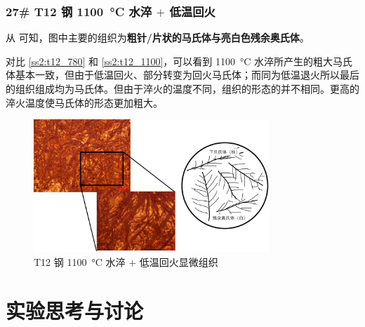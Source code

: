 \documentclass[a4paper,utf8]{article}
\begin{document}
        \subsubsection{27\# T12 钢 \SI{1100}{\degreeCelsius} 水淬 $+$ 低温回火\label{ss2:t12_1100}}
            从 可知，图中主要的组织为\textbf{粗针/片状的马氏体与亮白色残余奥氏体}。\par
            对比 \ref{ss2:t12_780} 和 \ref{ss2:t12_1100}，可以看到 \SI{1100}{\degreeCelsius} 水淬所产生的粗大马氏体基本一致，但由于低温回火、部分转变为回火马氏体；而同为低温退火所以最后的组织组成均为马氏体。但由于淬火的温度不同，组织的形态的并不相同。更高的淬火温度使马氏体的形态更加粗大。
            \begin{figure}[!ht]
                \includegraphics[height=50mm]{result/14.pdf}
                \caption{T12 钢 \SI{1100}{\degreeCelsius} 水淬 $+$ 低温回火显微组织\label{fig:14}}
            \end{figure}
\section{实验思考与讨论}
\end{document}
